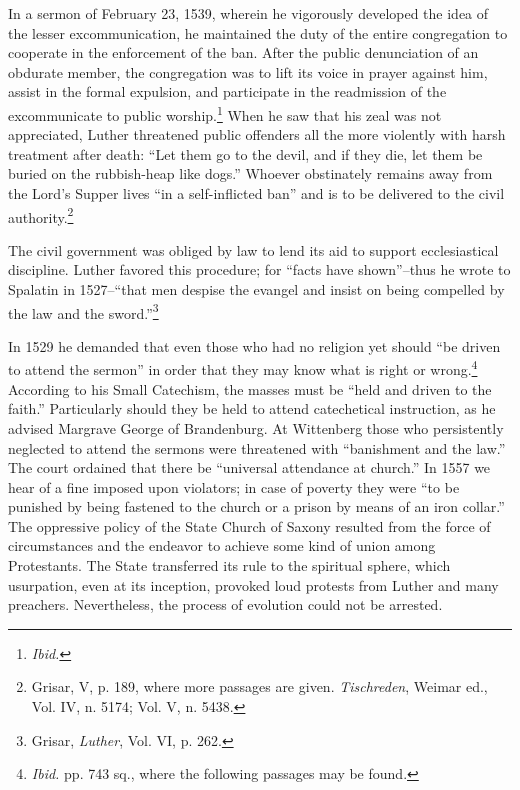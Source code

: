 In a sermon of February 23, 1539, wherein he vigorously developed
the idea of the lesser excommunication, he maintained the duty of
the entire congregation to cooperate in the enforcement of the ban.
After the public denunciation of an obdurate member, the congregation
was to lift its voice in prayer against him, assist in the formal
expulsion, and participate in the readmission of the excommunicate
to public worship.\footnote{\textit{Ibid.}}
When he saw that his zeal was not appreciated,
Luther threatened public offenders all the more violently with harsh
treatment after death: “Let them go to the devil, and if they die,
let them be buried on the rubbish-heap like dogs.” Whoever obstinately
remains away from the Lord’s Supper lives “in a self-inflicted
ban” and is to be delivered to the civil authority.\footnote
{Grisar, V, p. 189, where more passages are given. \textit{Tischreden}, Weimar ed., Vol. IV,
n. 5174; Vol. V, n. 5438.}

The civil government was obliged by law to lend its aid to support
ecclesiastical discipline. Luther favored this procedure; for “facts have
shown”--thus he wrote to Spalatin in 1527--“that men despise the
evangel and insist on being compelled by the law and the sword.”\footnote{Grisar, \textit{Luther}, Vol. VI, p. 262.}

In 1529 he demanded that even those who had no religion yet should
“be driven to attend the sermon” in order that they may know what
is right or wrong.\footnote{\textit{Ibid.} pp. 743 sq., where the following passages may be found.}
 According to his Small Catechism, the masses
must be “held and driven to the faith.” Particularly should they be
held to attend catechetical instruction, as he advised Margrave George
of Brandenburg. At Wittenberg those who persistently neglected to
attend the sermons were threatened with “banishment and the law.”
The court ordained that there be “universal attendance at church.”
In 1557 we hear of a fine imposed upon violators; in case of poverty
they were “to be punished by being fastened to the church or a
prison by means of an iron collar.” The oppressive policy of the State
Church of Saxony resulted from the force of circumstances and the
endeavor to achieve some kind of union among Protestants. The
State transferred its rule to the spiritual sphere, which usurpation,
even at its inception, provoked loud protests from Luther and many
preachers. Nevertheless, the process of evolution could not be arrested.


